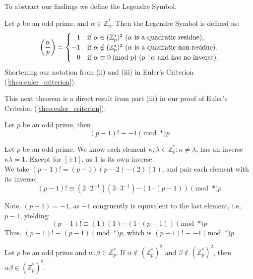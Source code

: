 \newpage
\noindent
To abstract our findings we define the Legendre Symbol.
\begin{Func}

    Let $p$ be an odd prime, and $\alpha\in\mathbb{Z}_p^*$. Then the Legendre Symbol is defined as:
    \[
    \left(\frac{\alpha}{p}\right) = \begin{cases}
        \hspace{.8em}1 & \text{if } \alpha\in\qres\text{ ($\alpha$ is a quadratic residue),}\\
        -1 & \text{if } \alpha\notin\qres\text{ ($\alpha$ is a quadratic non-residue).}\\
        \hspace{.8em}0 & \text{if } \alpha\equiv 0\pmod*{p}\text{ ($p\mid\alpha$ and has no inverse).}
    \end{cases}
    \]
    \noindent
    Shortening our notation from (ii) and (iii) in Euler's Criterion (\ref{theo:euler_criterion}).
\end{Func}

\noindent
This next theorem is a direct result from part (iii) in our proof of Euler's Criterion (\ref{theo:euler_criterion}).
\begin{theo}

    \label{theo:wilson}
    Let $p$ be an odd prime, then
    \Large
    \[
    (p-1)! \equiv -1 \pmod*{p}
    \]
    \normalsize
\end{theo}

\begin{Proof}

    Let $p$ be an odd prime. We know each element $\kappa,\lambda\in\mathbb{Z}_p^*:\kappa\neq\lambda$, has an inverse
    $\kappa\lambda=1$. Except for $[\pm1]$, as 1 is its own inverse.\\

    \noindent
    We take $(p-1)!=(p-1)(p-2)\cdots(2)(1)$, and pair each element with its inverse:
    \[
        (p-1)! \equiv (2\cdot2^{-1})(3\cdot3^{-1})\cdots(1\cdot(p-1)) \pmod*{p}
    \]

    \noindent
    Note, $(p-1)= -1$, as $-1$ congruently is equivalent to the last element, i.e., $p-1$, yielding:
    \[
        (p-1)! \equiv (1)(1)\cdots (1\cdot(p-1)) \pmod*{p}
    \]
    Thus, $(p-1)! \equiv (p-1) \pmod*{p}$, which is $(p-1)! \equiv -1 \pmod*{p}$.

\end{Proof}
\begin{theo}

    Let \( p \) be an odd prime and \( \alpha, \beta \in \mathbb{Z}_p^* \). 
If \( \alpha \notin (\mathbb{Z}_p^*)^2 \) and \( \beta \notin (\mathbb{Z}_p^*)^2 \), 
then \( \alpha\beta \in (\mathbb{Z}_p^*)^2 \).
\end{theo}

